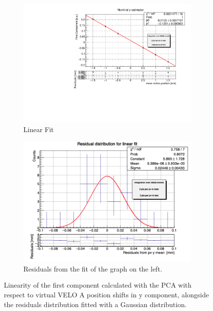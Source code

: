 \begin{figure}
    \centering
    \begin{subfigure}{0.48\textwidth}
    \includegraphics[width=\linewidth]{figures/y_estimate_veloA_MC.pdf}
    \caption{Linear Fit}\label{fig:y_veloA_fit_MC}
    \end{subfigure}
    \begin{subfigure}{0.48\textwidth}
    \includegraphics[width=\linewidth]{figures/y_res_veloA_MC.png}
    \caption{Residuals from the fit of the graph on the left. }\label{fig:y_veloA_res_MC}
    \end{subfigure}
    \caption{Linearity of the first component calculated with the PCA with respect to virtual VELO A position shifts in y component, alongside the residuals distribution fitted with a Gaussian distribution.}
    \label{fig:y_veloA_MC}
\end{figure}



